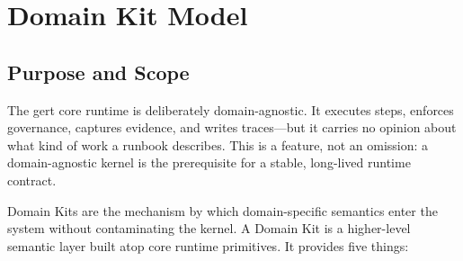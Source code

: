
\chapter{Domain Kit Model}
\label{ch:domain-kits}

\section{Purpose and Scope}
\label{sec:kit-purpose}

The gert core runtime is deliberately domain-agnostic.  It executes steps,
enforces governance, captures evidence, and writes traces---but it carries no
opinion about what kind of work a runbook describes.  This is a feature, not an
omission: a domain-agnostic kernel is the prerequisite for a stable, long-lived
runtime contract.

Domain Kits are the mechanism by which domain-specific semantics enter the
system without contaminating the kernel.  A Domain Kit is a higher-level
semantic layer built atop core runtime primitives.  It provides five things:

